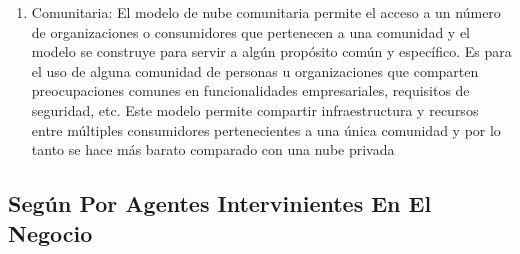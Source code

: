 \documentclass[a4paper, 12pt]{report}
\begin{document}
\begin{justify}
\begin{enumerate}[label=\alph*)]
    \item{Comunitaria:} El modelo de nube comunitaria permite el acceso a un número de organizaciones o consumidores que pertenecen a una comunidad y el modelo se construye para servir a algún propósito común y específico. Es para el uso de alguna comunidad de personas u organizaciones que comparten preocupaciones comunes en funcionalidades empresariales, requisitos de seguridad, etc. Este modelo permite compartir infraestructura y recursos entre múltiples consumidores pertenecientes a una única comunidad y por lo tanto se hace más barato comparado con una nube privada \cite{sandeep}
\end{enumerate}
\end{justify}

\subsection{Según Por Agentes Intervinientes En El Negocio}
\end{document}
